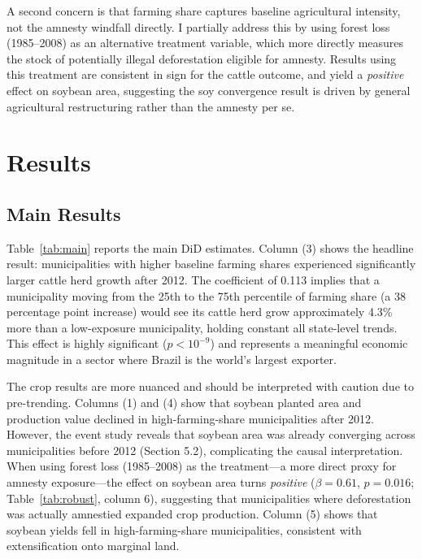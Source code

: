 \documentclass[12pt]{article}
\begin{document}
A second concern is that farming share captures baseline agricultural intensity, not the amnesty windfall directly. I partially address this by using forest loss (1985--2008) as an alternative treatment variable, which more directly measures the stock of potentially illegal deforestation eligible for amnesty. Results using this treatment are consistent in sign for the cattle outcome, and yield a \emph{positive} effect on soybean area, suggesting the soy convergence result is driven by general agricultural restructuring rather than the amnesty per se.


\section{Results}

\subsection{Main Results}



Table~\ref{tab:main} reports the main DiD estimates. Column (3) shows the headline result: municipalities with higher baseline farming shares experienced significantly larger cattle herd growth after 2012. The coefficient of 0.113 implies that a municipality moving from the 25th to the 75th percentile of farming share (a 38 percentage point increase) would see its cattle herd grow approximately 4.3\% more than a low-exposure municipality, holding constant all state-level trends. This effect is highly significant ($p < 10^{-9}$) and represents a meaningful economic magnitude in a sector where Brazil is the world's largest exporter.

The crop results are more nuanced and should be interpreted with caution due to pre-trending. Columns (1) and (4) show that soybean planted area and production value declined in high-farming-share municipalities after 2012. However, the event study reveals that soybean area was already converging across municipalities before 2012 (Section 5.2), complicating the causal interpretation. When using forest loss (1985--2008) as the treatment---a more direct proxy for amnesty exposure---the effect on soybean area turns \emph{positive} ($\beta = 0.61$, $p = 0.016$; Table~\ref{tab:robust}, column 6), suggesting that municipalities where deforestation was actually amnestied expanded crop production. Column (5) shows that soybean yields fell in high-farming-share municipalities, consistent with extensification onto marginal land.
\end{document}
